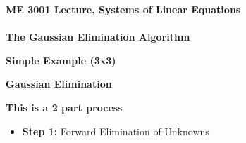 \documentclass[11pt]{article}
\begin{document}
\textbf{ \LARGE ME 3001 Lecture, Systems of Linear Equations} \\\\
\textbf{ \LARGE The Gaussian Elimination Algorithm} \\


 \renewcommand\labelitemi{\textbullet}
 \renewcommand\labelitemii{\textendash}
 \renewcommand\labelitemiii{\textasteriskcentered}
 \renewcommand\labelitemiv{\textperiodcentered}
\begin{description}


\item \textbf{ Simple Example (3x3)}

\newpage	
	\item \textbf{\LARGE Gaussian Elimination}\\	
	
\newpage
\Large
\item \textbf{ This is a 2 part process}
	
	
	\begin{itemize}
		\item {\bf Step 1:} Forward Elimination of Unknowns
		

\end{itemize}
\end{description}
\end{document}
